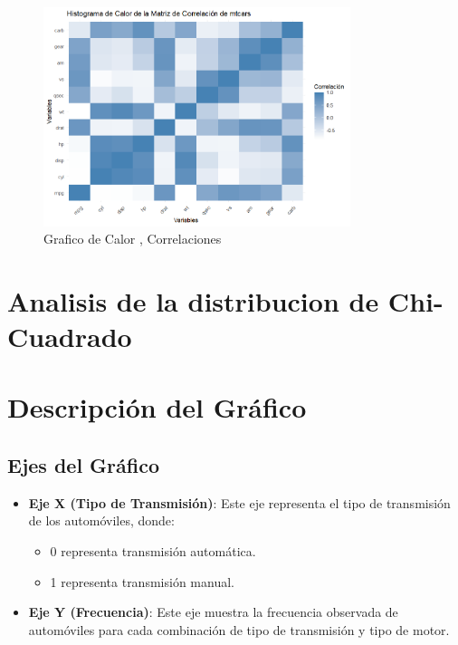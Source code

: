 \documentclass{article}
\begin{document}
\begin{figure}[h] %
    \centering %
    \includegraphics[width=0.8\textwidth]{imagen.png}
    \caption{Grafico de Calor , Correlaciones } %
    \label{fig:mi_imagen} %
\end{figure}
\section{Analisis de la distribucion de Chi-Cuadrado}

\section{Descripción del Gráfico}

\subsection{Ejes del Gráfico}
\begin{itemize}
    \item \textbf{Eje X (Tipo de Transmisión)}: Este eje representa el tipo de transmisión de los automóviles, donde:
        \begin{itemize}
            \item 0 representa transmisión automática.
            \item 1 representa transmisión manual.
        \end{itemize}
    \item \textbf{Eje Y (Frecuencia)}: Este eje muestra la frecuencia observada de automóviles para cada combinación de tipo de transmisión y tipo de motor.
\end{itemize}
\end{document}

